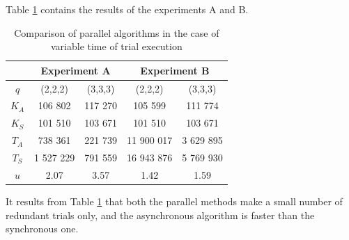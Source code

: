 Table \ref{tab:5_3} contains the results of the experiments A and B.
\begin{table}
\caption{Comparison of parallel algorithms in the case of variable time of trial execution}
\label {tab:5_3}
\begin{center}
\begin{tabular}{|c|c|c|c|c|}
\hline
 & \multicolumn{2}{c|}{Experiment A} & \multicolumn{2}{c|}{Experiment B} \\
\hline
$q$ & (2,2,2) & (3,3,3) & (2,2,2) & (3,3,3)    \\
\hline
$K_A$ & 106 802 & 117 270 & 105 599 & 111 774 \\
\hline
$K_S$ & 101 510 & 103 671 & 101 510 & 103 671 \\
\hline
$T_A$ & 738 361 & 221 739 & 11 900 017 & 3 629 895 \\
\hline
$T_S$ & 1 527 229 & 791 559 & 16 943 876 & 5 769 930 \\
\hline
$u$   & 2.07  &  3.57  &  1.42  &  1.59  \\
\hline
\end{tabular}
\end{center}
\end{table}

It results from Table \ref{tab:5_3} that both the parallel methods make a small number of redundant trials only, and the asynchronous algorithm is faster than the synchronous one.


